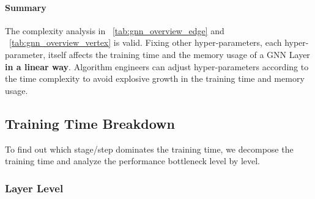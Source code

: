 \paragraph{Summary}

The complexity analysis in \tablename~\ref{tab:gnn_overview_edge} and \tablename~\ref{tab:gnn_overview_vertex} is valid.
Fixing other hyper-parameters, each hyper-parameter, itself affects the training time and the memory usage of a GNN Layer \textbf{in a linear way}.
Algorithm engineers can adjust hyper-parameters according to the time complexity to avoid explosive growth in the training time and memory usage.

\subsection{Training Time Breakdown}
\label{sec:training_time_breakdown}

To find out which stage/step dominates the training time, we decompose the training time and analyze the performance bottleneck level by level.

\subsubsection{Layer Level}

